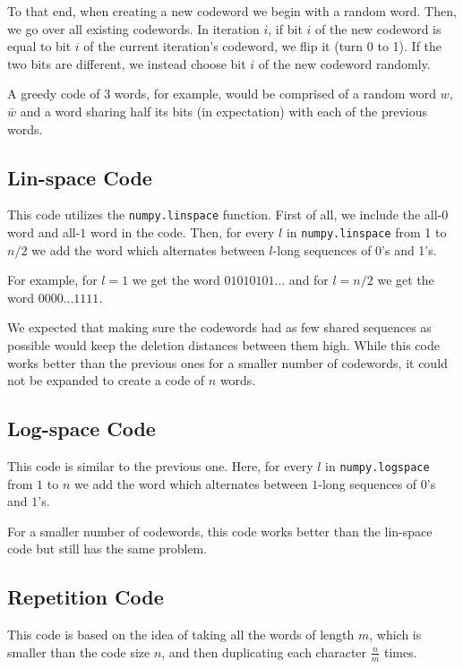 \documentclass{article}
\begin{document}
To that end, when creating a new codeword we begin with a random word. Then, we go over all existing codewords. In iteration $i$, if bit $i$ of the new codeword is equal to bit $i$ of the current iteration's codeword, we flip it (turn 0 to 1). If the two bits are different, we instead choose bit $i$ of the new codeword randomly.

A greedy code of 3 words, for example, would be comprised of a random word $w$, $\bar{w}$ and a word sharing half its bits (in expectation) with each of the previous words.

\subsection{Lin-space Code}

This code utilizes the \texttt{numpy.linspace} function. First of all, we include the all-$0$ word and all-$1$ word in the code. Then, for every $l$ in \texttt{numpy.linspace} from 1 to $n/2$ we add the word which alternates between $l$-long sequences of 0's and 1's.

For example, for $l=1$ we get the word $01010101...$ and for $l=n/2$ we get the word $0000...1111$.

We expected that making sure the codewords had as few shared sequences as possible would keep the deletion distances between them high. While this code works better than the previous ones for a smaller number of codewords, it could not be expanded to create a code of $n$ words.

\subsection{Log-space Code}

This code is similar to the previous one. Here, for every $l$ in \texttt{numpy.logspace} from $1$ to $n$ we add the word which alternates between $1$-long sequences of $0$'s and $1$'s.

For a smaller number of codewords, this code works better than the lin-space code but still has the same problem.

\subsection{Repetition Code}

This code is based on the idea of taking all the words of length $m$, which is smaller than the code size $n$, and then duplicating each character $\frac{n}{m}$ times.
\end{document}
